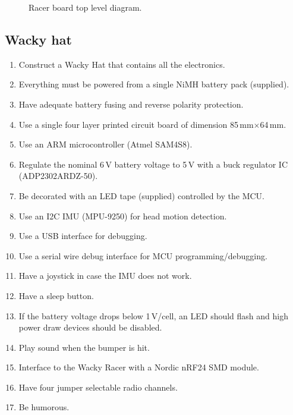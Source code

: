 \documentclass[11pt, a4paper]{article}
\begin{document}
\vspace{1cm}

\begin{figure}[h]
    \centering
    
    \caption{Racer board top level diagram.}
\end{figure}


\vfill\pagebreak

\subsection{Wacky hat}


\begin{enumerate}
\item Construct a Wacky Hat that contains all the electronics.
\item Everything must be powered from a single NiMH battery pack (supplied).  
\item Have adequate battery fusing and reverse polarity protection.
\item Use a single four layer printed circuit board of dimension 85\,mm$\times$64\,mm.  
\item Use an ARM microcontroller (Atmel SAM4S8).
\item Regulate the nominal 6\,V battery voltage to 5\,V with a buck
  regulator IC (ADP2302ARDZ-50).
\item Be decorated with an LED tape (supplied) controlled by the MCU.
\item Use an I2C IMU (MPU-9250) for head motion detection.
\item Use a USB interface for debugging.
\item Use a serial wire debug interface for MCU programming/debugging.
\item Have a joystick in case the IMU does not work.
\item Have a sleep button.
\item If the battery voltage drops below 1\,V/cell, an LED should flash and high power draw devices should be disabled.
\item Play sound when the bumper is hit.
\item Interface to the Wacky Racer with a Nordic nRF24 SMD module.  
\item Have four jumper selectable radio channels.    
\item Be humorous.  
\end{enumerate}

\end{document}
